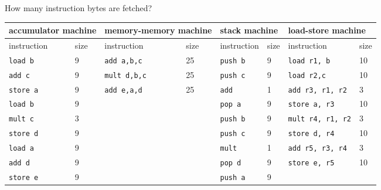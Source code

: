 \documentclass{article}
\begin{document}
\subsubsection{}
How many instruction bytes are fetched?\\
\begin{tabular}{l|ll|ll|ll|l|}
\hline
\multicolumn{2}{|l|}{accumulator machine} & \multicolumn{2}{|l|}{memory-memory machine} & \multicolumn{2}{|l|}{stack machine} & \multicolumn{2}{|l|}{load-store machine} \\ \hline
\multicolumn{1}{|l|}{instruction} & size & \multicolumn{1}{|l|}{instruction} & size & \multicolumn{1}{|l|}{instruction} & size & \multicolumn{1}{|l|}{instruction} & size \\ \hline
\multicolumn{1}{|l|}{\texttt{load b}} & 9 & \multicolumn{1}{|l|}{\texttt{add a,b,c}} & 25 & \multicolumn{1}{|l|}{\texttt{push b}} & 9 &\multicolumn{1}{|l|}{\texttt{load r1, b}} & 10 \\ 
\multicolumn{1}{|l|}{\texttt{add c}} & 9 &\multicolumn{1}{|l|}{\texttt{mult d,b,c}} & 25 & \multicolumn{1}{|l|}{\texttt{push c}} & 9 & \multicolumn{1}{|l|}{\texttt{load r2,c}} & 10 \\
\multicolumn{1}{|l|}{\texttt{store a}} & 9 & \multicolumn{1}{|l|}{\texttt{add e,a,d}} & 25 & \multicolumn{1}{|l|}{\texttt{add}} & 1 & \multicolumn{1}{|l|}{\texttt{add r3, r1, r2}} & 3\\
\multicolumn{1}{|l|}{\texttt{load b}} & 9 & \multicolumn{1}{|l|}{} & & \multicolumn{1}{|l|}{\texttt{pop a}} & 9 & \multicolumn{1}{|l|}{\texttt{store a, r3}} & 10\\
\multicolumn{1}{|l|}{\texttt{mult c}} & 3 & \multicolumn{1}{|l|}{} & & \multicolumn{1}{|l|}{\texttt{push b}} & 9 & \multicolumn{1}{|l|}{\texttt{mult r4, r1, r2}} & 3 \\
\multicolumn{1}{|l|}{\texttt{store d}} & 9 & \multicolumn{1}{|l|}{} & &\multicolumn{1}{|l|}{\texttt{push c}} & 9 & \multicolumn{1}{|l|}{\texttt{store d, r4}} & 10\\ 
\multicolumn{1}{|l|}{\texttt{load a}} & 9 & \multicolumn{1}{|l|}{} & & \multicolumn{1}{|l|}{\texttt{mult}} & 1 & \multicolumn{1}{|l|}{\texttt{add r5, r3, r4}} & 3 \\
\multicolumn{1}{|l|}{\texttt{add d}} & 9 & \multicolumn{1}{|l|}{} & & \multicolumn{1}{|l|}{\texttt{pop d}} & 9 & \multicolumn{1}{|l|}{\texttt{store e, r5}} & 10\\
\multicolumn{1}{|l|}{\texttt{store e}} & 9 & \multicolumn{1}{|l|}{} & & \multicolumn{1}{|l|}{\texttt{push a}} & 9 & \multicolumn{1}{|l|}{} & \\

\end{tabular}
\end{document}
